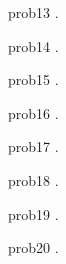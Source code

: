 \begin{sol}{prob13}
    .
\end{sol}

\begin{sol}{prob14}
    .
\end{sol}

\begin{sol}{prob15}
    .
\end{sol}

\begin{sol}{prob16}
    .
\end{sol}

\begin{sol}{prob17}
    .
\end{sol}

\begin{sol}{prob18}
    .
\end{sol}

\begin{sol}{prob19}
    .
\end{sol}

\begin{sol}{prob20}
    .
\end{sol}